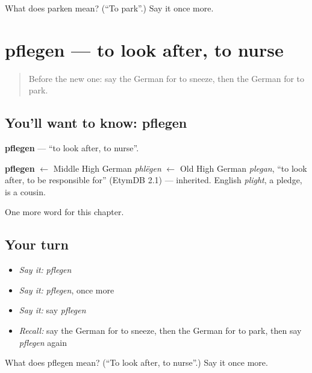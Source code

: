 \begin{tcolorbox}[breakable,colback=teal!4,colframe=teal!35!black,title={Before you move on}]
What does parken mean? (\textquotedblleft{}To park\textquotedblright{}.) Say it once more.
\end{tcolorbox}
\section[pflegen]{pflegen — to look after, to nurse}

\label{lesson:GE-C184-pflegen}



\begin{quote}
Before the new one: say the German for to sneeze, then the German for to park.
\end{quote}

\subsection*{You'll want to know: pflegen}
\textbf{pflegen} — \textquotedblleft{}to look after, to nurse\textquotedblright{}.

\begin{cousinweb}
\textbf{pflegen} $\leftarrow$ Middle High German \emph{phlëgen} $\leftarrow$ Old High German \emph{plegan}, \textquotedblleft{}to look after, to be responsible for\textquotedblright{} (EtymDB 2.1) — inherited. English \emph{plight}, a pledge, is a cousin.
\end{cousinweb}

\begin{grammarlens}[title={What you've built}]
One more word for this chapter.
\end{grammarlens}

\subsection*{Your turn}
\begin{itemize}
\raggedright
  \item \emph{Say it:} \emph{pflegen}
  \item \emph{Say it:} \emph{pflegen}, once more
  \item \emph{Say it:} say \emph{pflegen}
  \item \emph{Recall:} say the German for to sneeze, then the German for to park, then say \emph{pflegen} again
\end{itemize}

\begin{tcolorbox}[breakable,colback=teal!4,colframe=teal!35!black,title={Before you move on}]
What does pflegen mean? (\textquotedblleft{}To look after, to nurse\textquotedblright{}.) Say it once more.
\end{tcolorbox}
